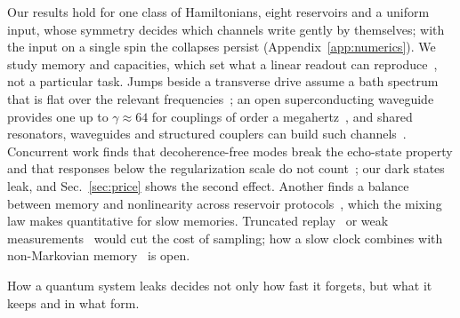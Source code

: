 Our results hold for one class of Hamiltonians, eight reservoirs and a uniform input, whose symmetry decides which
channels write gently by themselves; with the input on a single spin the collapses persist
(Appendix~\ref{app:numerics}). We study memory and capacities, which set what a linear readout can
reproduce~\cite{Dambre2012}, not a particular task. Jumps beside a transverse drive assume a bath spectrum that is
flat over the relevant frequencies~\cite{Cattaneo2019}; an open superconducting waveguide provides one up to
$\gamma\approx64$ for couplings of order a megahertz~\cite{Sheremet2023}, and shared resonators, waveguides and
structured couplers can build such channels~\cite{Cattaneo2019,Brehm2021,Sheremet2023,CattaneoPRX2023}. Concurrent
work finds that decoherence-free modes break the echo-state property and that responses below the regularization
scale do not count~\cite{Cao2026}; our dark states leak, and Sec.~\ref{sec:price} shows the second effect. Another
finds a balance between memory and nonlinearity across reservoir protocols~\cite{Cindrak2026}, which the mixing law
makes quantitative for slow memories. Truncated replay~\cite{Cindrak2024} or weak measurements~\cite{Mujal2023}
would cut the cost of sampling; how a slow clock combines with non-Markovian memory~\cite{Sannia2026Memory} is
open.

How a quantum system leaks decides not only how fast it forgets, but what it keeps and in what form.
